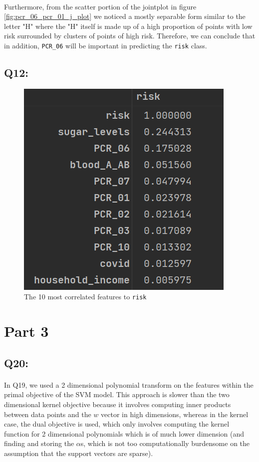 \documentclass{article}
\newcommand{\code}[1]{\texttt{#1}}
\begin{document}
    \paragraph*{}
     Furthermore, from the scatter portion of the jointplot in figure \ref{fig:pcr_06_pcr_01_j_plot} we noticed a mostly separable form similar to the letter "H" where the "H" itself is made up of a high proportion of points with low risk surrounded by clusters of points of high risk. Therefore, we can conclude that in addition, \code{PCR\_06} will be important in predicting the \code{risk} class.
\subsection*{Q12:}
    \begin{figure}[H]
        \centering
        \includegraphics{images/q12.png}
        \caption{The 10 most correlated features to \code{risk}}
    \end{figure}
\section*{Part 3}
\subsection*{Q20:}
    \paragraph*{}
    In Q19, we used a 2 dimensional polynomial transform on the features within the primal objective of the SVM model. This approach is slower than the two dimensional kernel objective because it involves computing inner products between data points and the $w$ vector in high dimensions, whereas in the kernel case, the dual objective is used, which only involves computing the kernel function for 2 dimensional polynomials which is of much lower dimension (and finding and storing the $\alpha$s, which is not too computationally burdensome on the assumption that the support vectors are sparse).
\end{document}
